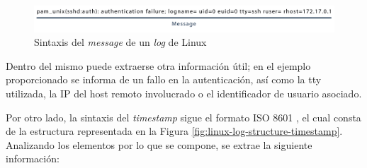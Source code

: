 \begin{figure}[H]
    \centering
    \includegraphics[width=1\linewidth]{imagenes/linux-log-structure-message.png}
    \caption{Sintaxis del \textit{message} de un \textit{log} de Linux}
    \label{fig:linux-log-structure-message}
\end{figure}

Dentro del mismo puede extraerse otra información útil; en el ejemplo proporcionado se informa de un fallo en la autenticación, así como la \gls{tty} utilizada, la \gls{IP} del host remoto involucrado o el identificador de usuario asociado.

Por otro lado, la sintaxis del \textit{timestamp} sigue el formato \gls{ISO} 8601 \cite{iso8601}, el cual consta de la estructura representada en la Figura \ref{fig:linux-log-structure-timestamp}. Analizando los elementos por lo que se compone, se extrae la siguiente información:

